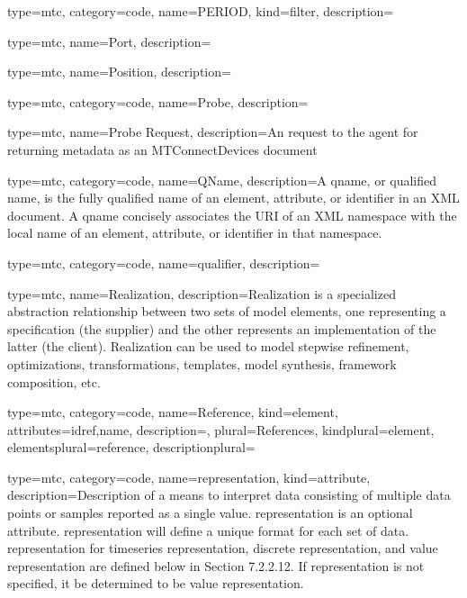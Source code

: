{
  type=mtc,
  category=code,
  name={PERIOD},
  kind={filter},
  description={}
}


{
  type=mtc,
  name={Port},
  description={}
}


{
  type=mtc,
  name={Position},
  description={}
}


{
  type=mtc,
  category=code,
  name={Probe},
  description={}
}


{
  type=mtc,
  name={Probe Request},
  description={An  request to the \gls{agent} for returning metadata as an MTConnectDevices  document}
}


{
  type=mtc,
  category=code,
  name={QName},
  description={A \gls{qname}, or qualified name, is the fully qualified name of an element, attribute, or identifier in an XML document. A  \gls{qname} concisely associates the URI of an XML namespace with the local name of an element, attribute, or identifier in that namespace.}
}


{
  type=mtc,
  category=code,
  name={qualifier},
  description={}
}


{
  type=mtc,
  name={Realization},
  description={Realization is a specialized abstraction relationship between two sets of model elements, one representing a specification (the supplier) and the other represents an implementation of the latter (the client). Realization can be used to model stepwise refinement, optimizations, transformations, templates, model synthesis, framework composition, etc.}
}


{
  type=mtc,
  category=code,
  name={Reference},
  kind={element},
  attributes={\gls{idref},\gls{name}},
  description={},
  plural={References},
  kindplural={element},
  elementsplural={\gls{reference}},
  descriptionplural={}
}


{
  type=mtc,
  category=code,
  name={representation},
  kind={attribute},
  description={Description of a means to interpret data consisting of multiple data points or samples reported as a single value.  \newline \gls{representation} is an optional attribute.  \newline \gls{representation} will define a unique format for each set of data.  \newline \gls{representation} for \gls{timeseries representation}, \gls{discrete representation}, and \gls{value representation} are defined below in Section {\color{red} 7.2.2.12}.  \newline If \gls{representation} is not specified, it \MUST be determined to be \gls{value representation}.}
}


